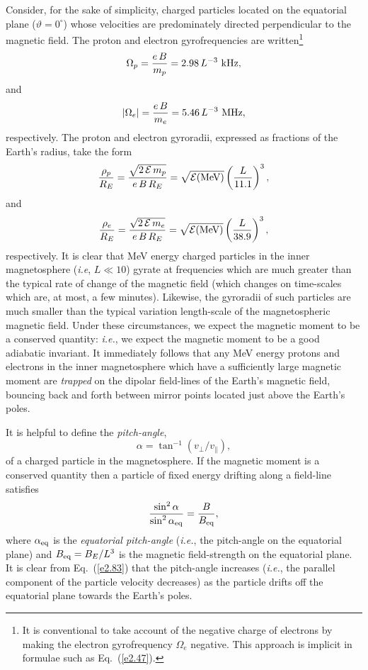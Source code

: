 Consider, for the sake of simplicity, charged particles located
 on the equatorial plane ($\vartheta=0^\circ$)
whose velocities are predominately directed perpendicular to the magnetic
field. The proton and electron gyrofrequencies are written\footnote{It
is conventional to take account of the negative charge of electrons by
making the electron gyrofrequency ${\Omega}_e$ negative. This approach is
implicit in formulae such as Eq.~(\ref{e2.47}).}
\begin{equation}
{\Omega}_p = \frac{e\,B}{m_p} = 2.98\,L^{-3}\,\,{\rm kHz},
\end{equation}
and
\begin{equation}
|{\Omega}_e| = \frac{e\,B}{m_e} = 5.46\,L^{-3}\,\,{\rm MHz},
\end{equation}
respectively. The proton and electron gyroradii, expressed as fractions
of the Earth's radius, take the form
\begin{equation}
\frac{\rho_p}{R_E} = \frac{\sqrt{2\,{\cal E}\,m_p}}{e\,B\,R_E} =
\sqrt{{\cal E}({\rm MeV)}}\left( \frac{L}{11.1}\right)^3,
\end{equation}
and
\begin{equation}
\frac{\rho_e}{R_E} =  \frac{\sqrt{2\,{\cal E}\,m_e}}{e\,B\,R_E} =\sqrt{{\cal E}({\rm MeV)}}\left( 
\frac{L}{38.9}\right)^3,
\end{equation}
respectively. It is clear that MeV energy charged particles in the inner
magnetosphere ({\em i.e}, $L \ll 10$) gyrate at frequencies which are much
greater than the typical  rate of change of the magnetic field (which changes on
time-scales which are, at most, a few minutes). Likewise, the gyroradii of
such  particles are much smaller than the typical variation length-scale
of the magnetospheric magnetic field. 
Under these circumstances, we expect the magnetic moment 
to be a conserved quantity:
{\em i.e.}, we expect the magnetic moment to be a good adiabatic invariant. 
It immediately follows that any MeV energy protons and electrons in the inner magnetosphere
which have a
sufficiently large magnetic moment are {\em trapped}\/ on the dipolar field-lines of the Earth's magnetic
field, bouncing back and forth between mirror points located just above
the Earth's poles.

It is helpful to define the {\em pitch-angle},
\begin{equation}
\alpha = \tan^{-1}(v_\perp/v_\parallel),
\end{equation}
of a charged particle in the magnetosphere. If the magnetic moment is
a conserved quantity then a particle of fixed energy drifting along a  field-line
satisfies
\begin{equation}\label{e2.89}
\frac{\sin^2\alpha}{\sin^2\alpha_{\rm eq}}=\frac{B}{B_{\rm eq}},
\end{equation}
where $\alpha_{\rm eq}$ is the {\em equatorial pitch-angle}\/ ({\em i.e.}, the
pitch-angle on the equatorial plane) and $B_{\rm eq}=B_E/L^3$ is the magnetic
field-strength on the equatorial plane. It is clear from Eq.~(\ref{e2.83}) that the
pitch-angle increases ({\em i.e.}, the parallel component of the particle
velocity decreases)
as the particle drifts off the equatorial plane towards the Earth's
poles.


